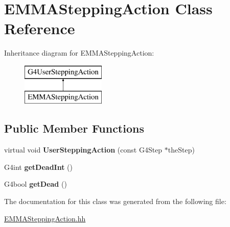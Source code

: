 \hypertarget{classEMMASteppingAction}{\section{E\-M\-M\-A\-Stepping\-Action Class Reference}
\label{classEMMASteppingAction}
}
Inheritance diagram for E\-M\-M\-A\-Stepping\-Action\-:\begin{figure}[H]
\begin{center}
\leavevmode
\includegraphics[height=2.000000cm]{classEMMASteppingAction}
\end{center}
\end{figure}
\subsection*{Public Member Functions}
\begin{DoxyCompactItemize}
\item 
\hypertarget{classEMMASteppingAction_a0c754bba2e35a1af14c6a9aecf06908f}{virtual void {\bfseries User\-Stepping\-Action} (const G4\-Step $\ast$the\-Step)}\label{classEMMASteppingAction_a0c754bba2e35a1af14c6a9aecf06908f}

\item 
\hypertarget{classEMMASteppingAction_a65e9a42604239c12e7956aca5623d041}{G4int {\bfseries get\-Dead\-Int} ()}\label{classEMMASteppingAction_a65e9a42604239c12e7956aca5623d041}

\item 
\hypertarget{classEMMASteppingAction_a80ef93ffeea7d90a8e767f46a365d18b}{G4bool {\bfseries get\-Dead} ()}\label{classEMMASteppingAction_a80ef93ffeea7d90a8e767f46a365d18b}

\end{DoxyCompactItemize}


The documentation for this class was generated from the following file\-:\begin{DoxyCompactItemize}
\item 
\hyperlink{EMMASteppingAction_8hh}{E\-M\-M\-A\-Stepping\-Action.\-hh}\end{DoxyCompactItemize}
